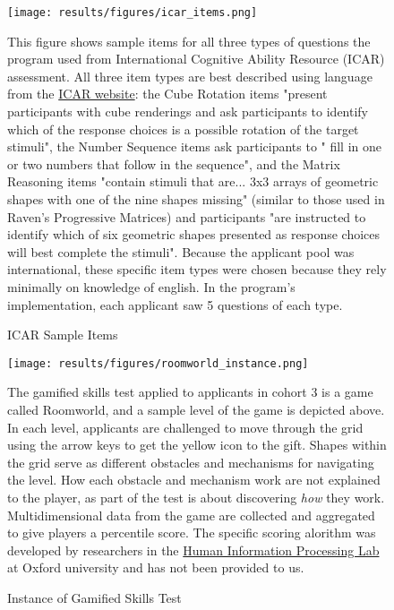     
    \newpage
    \begin{landscape}
    \null
    \vfill
    \begin{figure}[!htb]
    \centering
        \caption{ICAR Sample Items}\label{fig:icar_items}
    \texttt{[image: results/figures/icar\_items.png]} 
        \begin{notes}
    This figure shows sample items for all three types of questions the program used from International Cognitive Ability Resource (ICAR) assessment. All three item types are best described using language from the \hyperlink{https://icar-project.org/types/index.html}{ICAR website}: the Cube Rotation items "present participants with cube renderings and ask participants to identify which of the response choices is a possible rotation of the target stimuli", the Number Sequence items ask participants to " fill in one or two numbers that follow in the sequence", and the Matrix Reasoning items "contain stimuli that are... 3x3 arrays of geometric shapes with one of the nine shapes missing" (similar to those used in Raven's Progressive Matrices) and participants "are instructed to identify which of six geometric shapes presented as response choices will best complete the stimuli". Because the applicant pool was international, these specific item types were chosen because they rely minimally on knowledge of english. In the program's implementation, each applicant saw 5 questions of each type.
        \end{notes}
    \end{figure}
    \vfill
    \end{landscape}
    
    \newpage
    \null
    \vfill
    \begin{figure}[!htb]
    \centering
        \caption{Instance of Gamified Skills Test}\label{fig:roomworld_instance}
    \texttt{[image: results/figures/roomworld\_instance.png]} 
        \begin{notes}
    The gamified skills test applied to applicants in cohort 3 is a game called Roomworld, and a sample level of the game is depicted above. In each level, applicants are challenged to move through the grid using the arrow keys to get the yellow icon to the gift. Shapes within the grid serve as different obstacles and mechanisms for navigating the level. How each obstacle and mechanism work are not explained to the player, as part of the test is about discovering \emph{how} they work. Multidimensional data from the game are collected and aggregated to give players a percentile score. The specific scoring alorithm was developed by researchers in the \hyperlink{https://humaninformationprocessing.com/people/}{Human Information Processing Lab} at Oxford university and has not been provided to us. 
        \end{notes}
    \end{figure}
    \vfill
    
